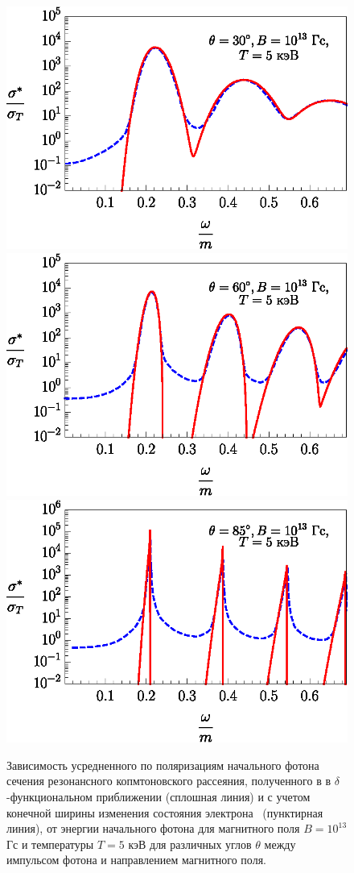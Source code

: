 \documentclass[cp1251%
               ]{jetp} %
\begin{document}
\begin{figure}[t!]\centering
\includegraphics[width=0.9\linewidth,clip]{fig1_1.eps}
\includegraphics[width=0.9\linewidth,clip]{fig1_2.eps}
\includegraphics[width=0.9\linewidth,clip]{fig1_3.eps}
\caption{Зависимость усредненного по поляризациям начального фотона сечения резонансного копмтоновского рассеяния, полученного в в $\delta$-функциональном приближении (сплошная линия) и с учетом конечной ширины изменения состояния электрона~\cite{Harding:1991} (пунктирная линия), от энергии начального фотона для магнитного поля $B = 10^{13}$ Гс и температуры $T=5$ кэВ для различных углов $\theta$ между импульсом фотона и направлением магнитного поля.}
\label{fig1}
\end{figure}
\end{document}
